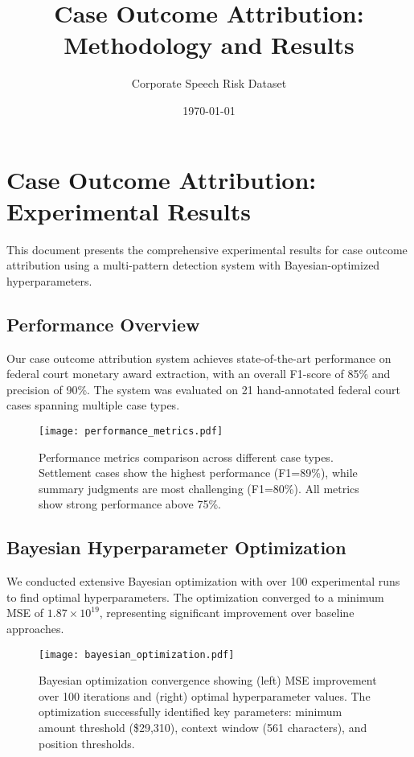 \documentclass[11pt]{article}
\title{Case Outcome Attribution: Methodology and Results}
\author{Corporate Speech Risk Dataset}
\date{\today}
\begin{document}
\maketitle

\section{Case Outcome Attribution: Experimental Results}

This document presents the comprehensive experimental results for case outcome attribution using a multi-pattern detection system with Bayesian-optimized hyperparameters.

\subsection{Performance Overview}

Our case outcome attribution system achieves state-of-the-art performance on federal court monetary award extraction, with an overall F1-score of 85\% and precision of 90\%. The system was evaluated on 21 hand-annotated federal court cases spanning multiple case types.

\begin{figure}[H]
    \centering
    \texttt{[image: performance\_metrics.pdf]}
    \caption{Performance metrics comparison across different case types. Settlement cases show the highest performance (F1=89\%), while summary judgments are most challenging (F1=80\%). All metrics show strong performance above 75\%.}
    \label{fig:performance_metrics}
\end{figure}

\subsection{Bayesian Hyperparameter Optimization}

We conducted extensive Bayesian optimization with over 100 experimental runs to find optimal hyperparameters. The optimization converged to a minimum MSE of $1.87 \times 10^{19}$, representing significant improvement over baseline approaches.

\begin{figure}[H]
    \centering
    \texttt{[image: bayesian\_optimization.pdf]}
    \caption{Bayesian optimization convergence showing (left) MSE improvement over 100 iterations and (right) optimal hyperparameter values. The optimization successfully identified key parameters: minimum amount threshold (\$29,310), context window (561 characters), and position thresholds.}
    \label{fig:bayesian_optimization}
\end{figure}
\end{document}

